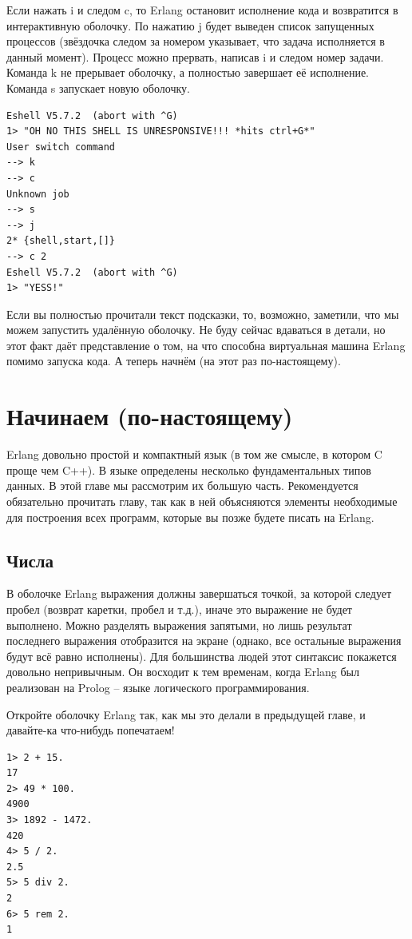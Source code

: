 \documentclass[a4paper,12pt]{report}
\newcommand{\ops}{\colorbox{lgreen}}
\begin{document}
Если нажать \ops{i} и следом \ops{c}, то Erlang остановит исполнение кода и возвратится в интерактивную оболочку. По нажатию \ops{j} будет выведен список запущенных процессов (звёздочка следом за номером указывает, что задача исполняется в данный момент). Процесс можно прервать, написав \ops{i} и следом номер задачи. Команда \ops{k} не прерывает оболочку, а полностью завершает её исполнение. Команда \ops{s} запускает новую оболочку.
\begin{lstlisting}[style=repl]
Eshell V5.7.2  (abort with ^G)
1> "OH NO THIS SHELL IS UNRESPONSIVE!!! *hits ctrl+G*"
User switch command
--> k
--> c
Unknown job
--> s
--> j
2* {shell,start,[]}
--> c 2
Eshell V5.7.2  (abort with ^G)
1> "YESS!"
\end{lstlisting}

Если вы полностью прочитали текст подсказки, то, возможно, заметили, что мы можем запустить удалённую оболочку. Не буду сейчас вдаваться в детали, но этот факт даёт представление о том, на что способна виртуальная машина Erlang помимо запуска кода. А теперь начнём (на этот раз по\--настоящему).
\chapter{Начинаем (по\--настоящему)} 
\label{starting_out_for_real}
\colorbox{lgray}
{
    \begin{minipage}{\linewidth}
    Erlang довольно простой и компактный язык (в том же смысле, в котором C проще чем C++). В языке определены несколько фундаментальных типов данных. В этой главе мы рассмотрим их большую часть. Рекомендуется обязательно прочитать главу, так как в ней объясняются элементы необходимые для построения всех программ, которые вы позже будете писать на Erlang.
    \end{minipage}
}
\section{Числа}
В оболочке Erlang выражения должны завершаться точкой, за которой следует пробел (возврат каретки, пробел и т.д.), иначе это выражение не будет выполнено. Можно разделять выражения запятыми, но лишь результат последнего выражения отобразится на экране (однако, все остальные выражения будут всё равно исполнены). Для большинства людей этот синтаксис покажется довольно непривычным. Он восходит к тем временам, когда Erlang был реализован на Prolog \--- языке логического программирования.

Откройте оболочку Erlang так, как мы это делали в предыдущей главе, и давайте\--ка что\--нибудь попечатаем!
\begin{lstlisting}[style=repl]
1> 2 + 15.
17
2> 49 * 100.
4900
3> 1892 - 1472.
420
4> 5 / 2.
2.5
5> 5 div 2.
2
6> 5 rem 2.
1
\end{lstlisting}
\end{document}

